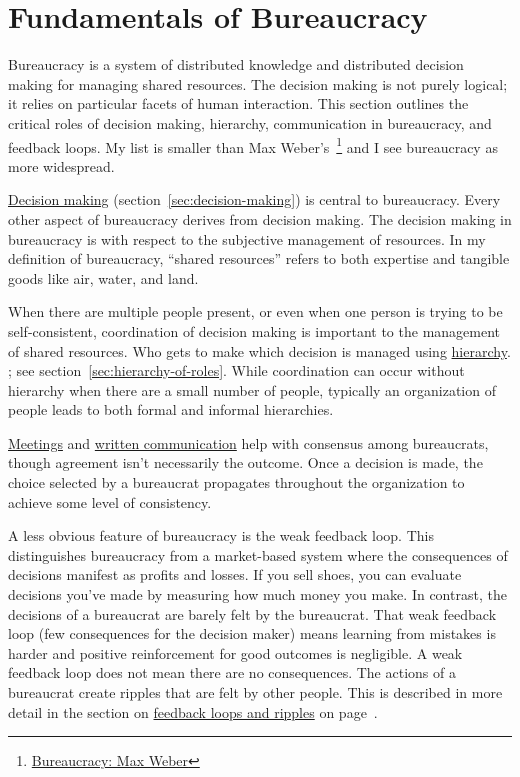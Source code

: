 \section{Fundamentals of Bureaucracy\label{sec:fundamentals-of-b}}
  
Bureaucracy is a system of distributed knowledge and distributed decision making for managing shared resources. The decision making is not purely logical; it relies on particular facets of human interaction. This section outlines the critical roles of decision making, hierarchy, communication in bureaucracy, and feedback loops. 
My list is smaller than Max Weber's~\cite{2015_Weber}\footnote{\href{https://en.wikipedia.org/wiki/Bureaucracy\#Max_Weber}{Bureaucracy: Max Weber}} and I see bureaucracy as more widespread.

\hyperref[sec:decision-making]{Decision making}
\ifsectionref
(section~\ref{sec:decision-making}) 
\fi
is central to bureaucracy. Every other aspect of bureaucracy derives from decision making. The decision making in bureaucracy is with respect to the subjective management of resources. In my definition of bureaucracy, ``\glspl{shared resource}'' refers to both expertise and tangible goods like air, water, and land. 

When there are multiple people present, or even when one person is trying to be self-consistent, coordination of decision making is important to the management of shared resources. Who gets to make which decision is managed using
\hyperref[sec:hierarchy-of-roles]{hierarchy}.
\ifsectionref
; see section~\ref{sec:hierarchy-of-roles}.
\fi
While coordination can occur without hierarchy when there are a small number of people, typically an organization of people leads to both formal and informal hierarchies. 

\hyperref[sec:meetings-for-coordination]{Meetings} and \hyperref[sec:written-communication]{written communication} help with consensus among bureaucrats, though agreement isn't necessarily the outcome.
Once a decision is made, the choice selected by a bureaucrat propagates throughout the organization to achieve some level of consistency. 

A less obvious feature of bureaucracy is the weak \gls{feedback loop}. This distinguishes bureaucracy from a market-based system where the consequences of decisions manifest as profits and losses. If you sell shoes, you can evaluate decisions you've made by measuring how much money you make. In contrast, the decisions of a bureaucrat are barely felt by the bureaucrat. That weak feedback loop (few consequences for the decision maker) means learning from mistakes is harder and positive reinforcement for good outcomes is negligible. A weak feedback loop does not mean there are no consequences. The actions of a bureaucrat create ripples that are felt by other people. This is described in more detail in the section on \hyperref[sec:feedback-loop-and-ripples]{feedback loops and ripples} on page~\pageref{sec:feedback-loop-and-ripples}.

